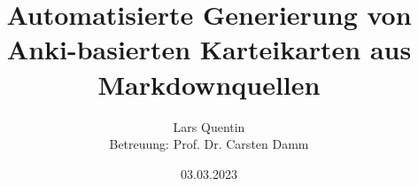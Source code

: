 \title{Automatisierte Generierung von Anki-basierten Karteikarten aus Markdownquellen}
\author{Lars Quentin\\ Betreuung: Prof. Dr. Carsten Damm}
\date{03.03.2023}
